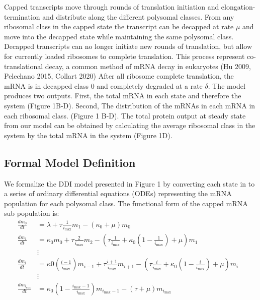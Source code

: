 \documentclass[review]{elsarticle}
\newcommand{\imax}{\ensuremath{{i_{\max}}}\xspace}
\begin{document}
Capped transcripts move through rounds of translation initiation and elongation-termination and distribute along the different polysomal classes. 
From any ribosomal class in the capped state the transcript can be decapped at rate $\mu$  and move into the decapped state while maintaining the same polysomal class.
Decapped transcripts can no longer initiate new rounds of translation, but allow for currently loaded ribosomes to complete translation. 
This process represent co-translational decay, a common method of mRNA decay in eukaryotes (Hu 2009, Pelechano 2015, Collart 2020) 
After all ribosome complete translation, the mRNA is in decapped class 0 and completely degraded at a rate $\delta$.
The model produces two outputs. 
First, the total mRNA in each state and therefore the system (Figure 1B-D). 
Second, The distribution of the mRNAs in each mRNA in each ribosomal class. (Figure 1 B-D).
The total protein output at steady state from our model can be obtained by calculating the average ribosomal class in the system by the total mRNA in the system (Figure 1D). 

\subsection{Formal Model Definition}
We formalize the DDI model presented in Figure 1 by converting each state in to a series of ordinary differential equations (ODEs) representing the mRNA population for each polysomal class. 
The functional form of the capped mRNA sub population is:
\begin{align} \label{eq:Capped_ODE}
\frac{dm_{0}}{dt} &= \lambda+ \tau \frac{1}{\imax}m_{1}-\left(\kappa_0 + \mu\right)m_{0} \\ \nonumber
\frac{dm_{1}}{dt} &= \kappa_0 m_{0}+ \tau \frac{2}{\imax}m_{2}-\left( \tau \frac{1}{\imax}+\kappa_0\left(1-\frac{1}{\imax}\right)+\mu\right) m_{1}\\ \nonumber
& \vdots & \\ \nonumber
\frac{dm_{i}}{dt} &= \kappa0 \left(\frac{i-1}{\imax}\right) m_{i-1}+ \tau \frac{i+1}{\imax}m_{i+1}-\left( \tau \frac{i}{\imax}+\kappa_0\left(1-\frac{i}{\imax}\right)+\mu\right) m_{i} \\ \nonumber
& \vdots & \\ \nonumber
\frac{dm_{\imax}}{dt} &= \kappa_0\left(1-\frac{\imax-1}{\imax}\right)m_{\imax-1}-\left( \tau +\mu\right) m_{\imax}\\ \nonumber
\end{align}
\end{document}
